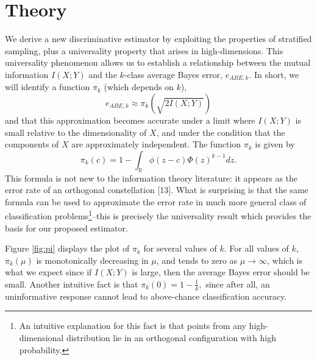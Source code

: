 \documentclass{article}
\begin{document}
\section{Theory}

We derive a new discriminative estimator by exploiting the properties
of stratified sampling, plus a universality property that arises in
high-dimensions.  This universality phenomenon allows us to establish
a relationship between the mutual information $I(X; Y)$ and the
$k$-class average Bayes error, $e_{ABE, k}$.  In short, we will
identify a function $\pi_k$ (which depends on $k$),
\begin{equation}\label{abepi}
e_{ABE, k} \approx \pi_k(\sqrt{2 I(X; Y)})
\end{equation}
and that this approximation becomes accurate under a limit where $I(X;
Y)$ is small relative to the dimensionality of $X$, and under the
condition that the components of $X$ are approximately independent.
The function $\pi_k$ is given by
\[
\pi_k(c) = 1 - \int_{\mathbb{R}} \phi(z - c)  \Phi(z)^{k-1} dz.
\]
This formula is not new to the information theory literature: it
appears as the error rate of an orthogonal constellation [13].  What
is surprising is that the same formula can be used to approximate the
error rate in much more general class of classification
problems\footnote{An intuitive explanation for this fact is that
  points from any high-dimensional distribution lie in an orthogonal
  configuration with high probability.}--this is precisely the
universality result which provides the basis for our proposed
estimator.

Figure \ref{fig:pi} displays the plot of $\pi_k$ for several values of
$k$.  For all values of $k$, $\pi_k(\mu)$ is monotonically decreasing
in $\mu$, and tends to zero as $\mu \to \infty$, which is what we
expect since if $I(X; Y)$ is large, then the average Bayes error
should be small.  Another intuitive fact is that $ \pi_k(0) = 1 -
\frac{1}{k}, $ since after all, an uninformative response cannot lead
to above-chance classification accuracy.
\end{document}
